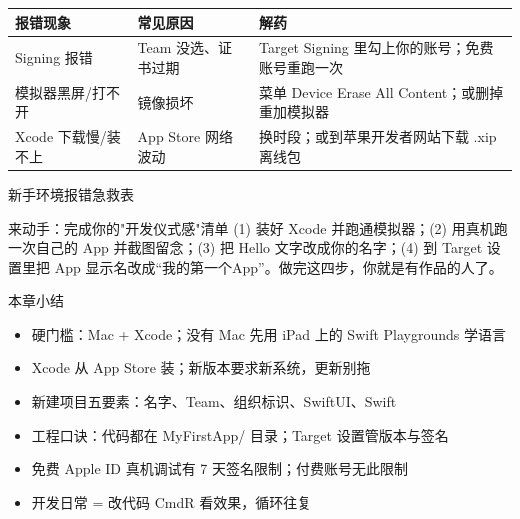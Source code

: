 \begin{center}
\begin{tabularx}{\linewidth}{|X|X|X|}
\hline
\textbf{报错现象} & \textbf{常见原因} & \textbf{解药} \tabularnewline
\hline
Signing 报错 & Team 没选、证书过期 & Target Signing 里勾上你的账号；免费账号重跑一次 \tabularnewline
模拟器黑屏/打不开 & 镜像损坏 & 菜单 Device Erase All Content；或删掉重加模拟器 \tabularnewline
Xcode 下载慢/装不上 & App Store 网络波动 & 换时段；或到苹果开发者网站下载 .xip 离线包 \tabularnewline
\hline
\end{tabularx}
\end{center}

\begin{center}\small\color{gray}新手环境报错急救表\end{center}

\begin{tcbpractice}{来动手：完成你的"开发仪式感"清单}
(1) 装好 Xcode 并跑通模拟器；(2) 用真机跑一次自己的 App 并截图留念；(3) 把 Hello 文字改成你的名字；(4) 到 Target 设置里把 App 显示名改成“我的第一个App”。做完这四步，你就是有作品的人了。

\end{tcbpractice}

\begin{tcbsummary}{本章小结}
\begin{itemize}
  \item 硬门槛：Mac + Xcode；没有 Mac 先用 iPad 上的 Swift Playgrounds 学语言
  \item Xcode 从 App Store 装；新版本要求新系统，更新别拖
  \item 新建项目五要素：名字、Team、组织标识、SwiftUI、Swift
  \item 工程口诀：代码都在 MyFirstApp/ 目录；Target 设置管版本与签名
  \item 免费 Apple ID 真机调试有 7 天签名限制；付费账号无此限制
  \item 开发日常 = 改代码 CmdR 看效果，循环往复
\end{itemize}

\end{tcbsummary}
